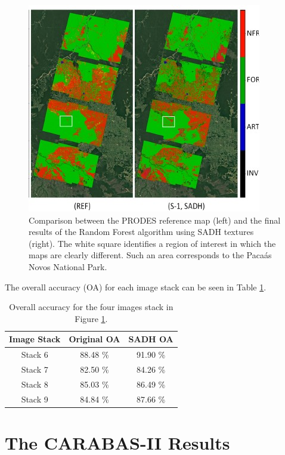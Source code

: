 \begin{figure}
    \centering
    \includegraphics{Cap3-Results/sentinel1-classificationresults.jpg}
    \caption{Comparison between the PRODES reference map (left) and the final results of the Random Forest algorithm using SADH textures (right). The white square identifies a region of interest in which the maps are clearly different.
    Such an area corresponds to the Pacaás Novos National Park.}
    \label{img:sentinel_results}
\end{figure}

The overall accuracy (OA) for each image stack can be seen in Table \ref{tab:sentinel_table_results}.

\begin{table}[H]
    \centering
    \begin{tabular}{ |c |c | c|}
     \hline
        Image Stack & Original OA & SADH OA\\ \hline \hline
        Stack 6 & 88.48 \% & 91.90 \% \\ \hline
        Stack 7 & 82.50 \% & 84.26 \% \\ \hline
        Stack 8 & 85.03 \% & 86.49 \% \\ \hline
        Stack 9 & 84.84 \% & 87.66 \% \\  \hline
    \end{tabular}
    \caption{Overall accuracy for the four images stack in Figure \ref{img:sentinel_results}.}
    \label{tab:sentinel_table_results}
\end{table}

\section{The CARABAS-II Results}





